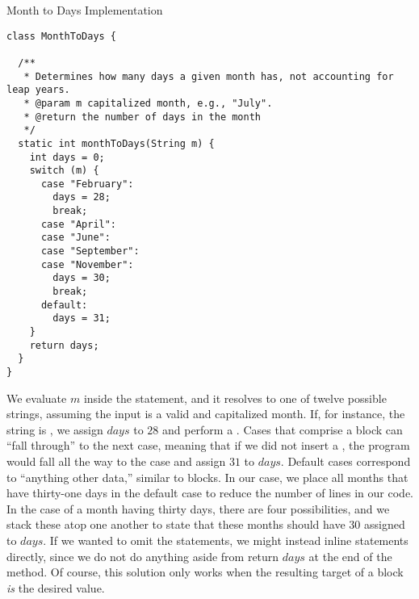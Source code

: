 \begin{cl}[]{Month to Days Implementation}
\begin{lstlisting}[language=MyJava]
class MonthToDays {

  /**
   * Determines how many days a given month has, not accounting for leap years.
   * @param m capitalized month, e.g., "July".
   * @return the number of days in the month
   */
  static int monthToDays(String m) {
    int days = 0;
    switch (m) {
      case "February":
        days = 28;
        break;
      case "April":
      case "June":
      case "September":
      case "November":
        days = 30;
        break;
      default:
        days = 31;
    }
    return days;
  }
}
\end{lstlisting}
\end{cl}

We evaluate $m$ inside the  statement, and it resolves to one of twelve possible strings, assuming the input is a valid and capitalized month. If, for instance, the string is , we assign $\mathit{days}$ to $28$ and perform a . Cases that comprise a  block can ``fall through'' to the next case, meaning that if we did not insert a , the program would fall all the way to the  case and assign $31$ to $\mathit{days}$. Default cases correspond to ``anything other data,'' similar to  blocks. In our case, we place all months that have thirty-one days in the default case to reduce the number of lines in our code. In the case of a month having thirty days, there are four possibilities, and we stack these atop one another to state that these months should have $30$ assigned to $\mathit{days}$. If we wanted to omit the  statements, we might instead inline  statements directly, since we do not do anything aside from return $\mathit{days}$ at the end of the method. Of course, this solution only works when the resulting target of a  block \textit{is} the desired value.